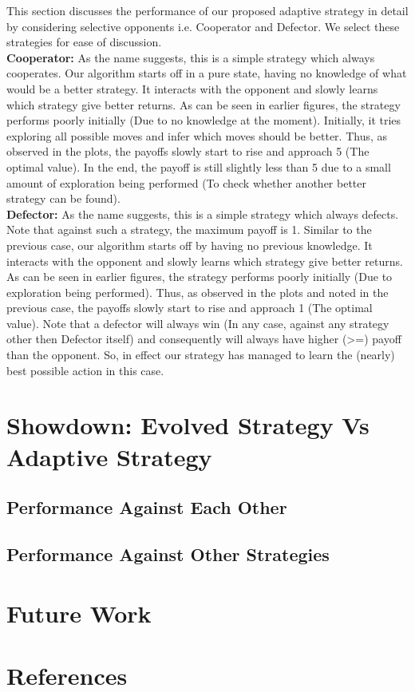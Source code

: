 \documentclass[a4paper]{article}
\begin{document}
	This section discusses the performance of our proposed adaptive strategy in detail by considering selective opponents i.e. Cooperator and Defector. We select these strategies for ease of discussion.\\
	
	\noindent
	\textbf{Cooperator: } As the name suggests, this is a simple strategy which always cooperates. Our algorithm starts off in a pure state, having no knowledge of what would be a better strategy. It interacts with the opponent and slowly learns which strategy give better returns. As can be seen in earlier figures, the strategy performs poorly initially (Due to no knowledge at the moment). Initially, it tries exploring all possible moves and infer which moves should be better. Thus, as observed in the plots, the payoffs slowly start to rise and approach 5 (The optimal value). In the end, the payoff is still slightly less than 5 due to a small amount of exploration being performed (To check whether another better strategy can be found).\\
	
	\noindent
	\textbf{Defector: } As the name suggests, this is a simple strategy which always defects. Note that against such a strategy, the maximum payoff is 1. 	Similar to the previous case, our algorithm starts off by having no previous knowledge. It interacts with the opponent and slowly learns which strategy give better returns. As can be seen in earlier figures, the strategy performs poorly initially (Due to exploration being performed). Thus, as observed in the plots and noted in the previous case, the payoffs slowly start to rise and approach 1 (The optimal value). Note that a defector will always win (In any case, against any strategy other then Defector itself) and consequently will always have higher (>=) payoff than the opponent. So, in effect our strategy has managed to learn the (nearly) best possible action in this case.

	\section{Showdown: Evolved Strategy Vs Adaptive Strategy}

	\subsection{Performance Against Each Other}
	\subsection{Performance Against Other Strategies}

	\section{Future Work}
			
	\section{References}
\end{document}
